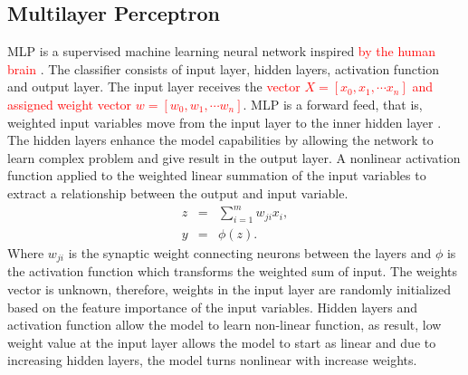 \documentclass[a4paper,fleqn]{cas-dc}
\newcommand\mycorrections[1]{\textcolor{red}{#1}}
\begin{document}
\subsection{Multilayer Perceptron }\label{MLP}

MLP is a supervised machine learning neural network inspired \mycorrections{by the human brain \cite{haykin2004comprehensive}}. The classifier consists of input layer, hidden layers, activation function and output layer. The input layer receives the \mycorrections{vector $X = \left[ x_{0}, x_{1},\cdots x_{n}  \right]$ and assigned  weight vector $ w = \left[ w_{0}, w_{1}, \cdots w_{n} \right] $}. MLP is a forward feed, that is,  weighted input variables  move from the input layer to the inner hidden layer \cite{aggarwal2014data}. The hidden layers enhance the model capabilities by allowing the network to learn complex  problem and give result in the output layer. A nonlinear activation function applied to the weighted linear summation of the input variables to extract a relationship between the output and input variable.
\begin{eqnarray}
z  &=& \sum_{i=1}^{m} w_{ji}x_{i},\\
y &= & \phi(z).
\end{eqnarray}
Where $w_{ji}$ is the synaptic weight connecting neurons between the layers and $\phi$ is the activation function which transforms the weighted sum of input.  
The weights vector is unknown, therefore, weights in the input layer are randomly initialized based on the feature importance of the input variables. Hidden layers and activation function allow the model to learn non-linear function, as result, low weight value at the input layer allows the model to start as linear and due to increasing hidden layers,  the model turns nonlinear with increase weights.
\end{document}

